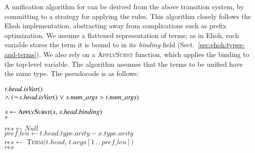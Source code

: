   A unification algorithm for \lfhol{} can be derived from the above transition
  system, by committing to a strategy for applying the rules.
  This algorithm closely follows the Ehoh implementation, abstracting away from
  complications such as prefix optimization. We assume a flattened
  representation of terms; as in Ehoh, each variable stores the term it is bound
  to in its \textit{binding} field (Sect.~\ref{sec:ehoh:types-and-terms}).
  We also rely on a \textsc{ApplySubst} function, which applies the
  binding to the top-level variable. The algorithm assumes that the terms
  to be unified have the same type. The pseudocode is as follows:

  \begin{quotex}
    \q \MyReturn $\begin{aligned}[t]
      & t.\mathit{head}.\mathit{isVar}() \\[-\jot]
      & {\mathrel\land}\; (\lnot\, s.\mathit{head}.\mathit{isVar}()
      \mathrel\lor s.\mathit{num\_args} > t.\mathit{num\_args})
      \end{aligned}$
    
    \jot
    
    \q {}
    \qq $s \gets \textsc{ApplySubst}(s{,}\; s.\mathit{head}.\mathit{binding})$ \\
    \q \MyReturn $s$
    
    \jot
    
    \q $\mathit{res} \gets \mathit{Null}$ \\
    \q {}
    \qq $\mathit{pref\_len} \gets \mathit{t}.\mathit{head}.\mathit{type}.\mathit{arity} - x.\mathit{type}.\mathit{arity}$ \\
    \qq {}
    \qqq $\mathit{res} \gets $
                \textsc{Term}$(t.\mathit{head}$, $t.\mathit{args}[1 \,.\,.\, \mathit{pref\_len}])$ \\
    \q \MyReturn $\mathit{res}$
    
    \jot
    

\end{quotex}
